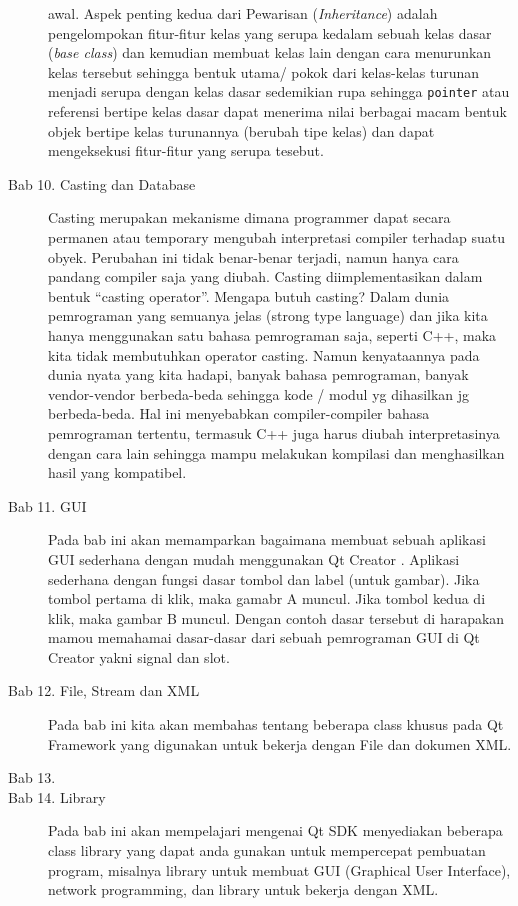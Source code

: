 \begin{description}
awal. Aspek penting kedua dari Pewarisan (\emph{Inheritance}) adalah
pengelompokan fitur-fitur kelas yang serupa kedalam sebuah kelas dasar
(\emph{base class}) dan kemudian membuat kelas lain dengan cara
menurunkan kelas tersebut sehingga bentuk utama/ pokok dari kelas-kelas
turunan menjadi serupa dengan kelas dasar sedemikian rupa sehingga
\texttt{pointer} atau referensi bertipe kelas dasar dapat menerima nilai
berbagai macam bentuk objek bertipe kelas turunannya (berubah tipe
kelas) dan dapat mengeksekusi fitur-fitur yang serupa tesebut.
\item[Bab 10. Casting dan Database] Casting merupakan mekanisme dimana programmer dapat secara permanen atau
temporary mengubah interpretasi compiler terhadap suatu obyek. Perubahan
ini tidak benar-benar terjadi, namun hanya cara pandang compiler saja
yang diubah. Casting diimplementasikan dalam bentuk ``casting
operator''. Mengapa butuh casting? Dalam dunia pemrograman yang semuanya
jelas (strong type language) dan jika kita hanya menggunakan satu bahasa
pemrograman saja, seperti C++, maka kita tidak membutuhkan operator
casting. Namun kenyataannya pada dunia nyata yang kita hadapi, banyak
bahasa pemrograman, banyak vendor-vendor berbeda-beda sehingga kode /
modul yg dihasilkan jg berbeda-beda. Hal ini menyebabkan
compiler-compiler bahasa pemrograman tertentu, termasuk C++ juga harus
diubah interpretasinya dengan cara lain sehingga mampu melakukan
kompilasi dan menghasilkan hasil yang kompatibel.
\item[Bab 11. GUI] Pada bab ini akan memamparkan bagaimana membuat sebuah aplikasi GUI 
sederhana dengan mudah menggunakan Qt Creator . Aplikasi sederhana dengan
fungsi dasar tombol dan label (untuk gambar). Jika tombol pertama di klik, maka
gamabr A muncul. Jika tombol kedua di klik, maka gambar B muncul. Dengan
contoh dasar tersebut di harapakan mamou memahamai dasar-dasar dari sebuah
pemrograman GUI di Qt Creator yakni signal dan slot.
\item[Bab 12. File, Stream dan XML] Pada bab ini kita akan membahas 
tentang beberapa class khusus pada Qt Framework yang digunakan untuk
bekerja dengan File dan dokumen XML.
\item[Bab 13.]
\item[Bab 14. Library] Pada bab ini akan mempelajari mengenai Qt SDK
menyediakan beberapa class library yang dapat anda gunakan untuk
mempercepat pembuatan program, misalnya library untuk membuat GUI
(Graphical User Interface), network programming, dan library untuk
bekerja dengan XML.

\end{description}